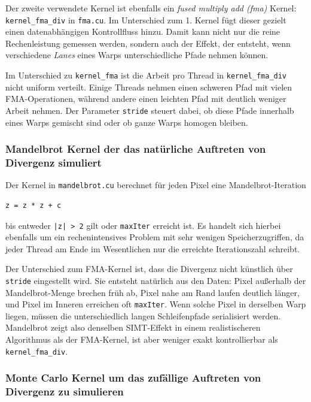 Der zweite verwendete Kernel ist ebenfalls ein \textit{fused multiply add (fma)} Kernel: 
\texttt{kernel\_fma\_div} in \texttt{fma.cu}. 
Im Unterschied zum 1. Kernel fügt dieser gezielt einen datenabhängigen Kontrollfluss hinzu. 
Damit kann nicht nur die reine Rechenleistung gemessen werden, sondern auch der Effekt, der entsteht, 
wenn verschiedene \textit{Lanes} eines Warps unterschiedliche Pfade nehmen können.

Im Unterschied zu \texttt{kernel\_fma} ist die Arbeit pro Thread in \texttt{kernel\_fma\_div} 
nicht uniform verteilt. Einige Threads nehmen einen schweren Pfad mit vielen FMA-Operationen,
während andere einen leichten Pfad mit deutlich weniger Arbeit nehmen. Der Parameter
\texttt{stride} steuert dabei, ob diese Pfade innerhalb eines Warps gemischt sind
oder ob ganze Warps homogen bleiben.

\subsubsection{Mandelbrot Kernel der das natürliche Auftreten von Divergenz simuliert}

Der Kernel in \texttt{mandelbrot.cu} berechnet für jeden Pixel eine
Mandelbrot-Iteration

\begin{verbatim}
z = z * z + c
\end{verbatim}

bis entweder \texttt{|z| > 2} gilt oder \texttt{maxIter} erreicht ist. Es handelt sich 
hierbei ebenfalls um ein rechenintensives Problem mit sehr wenigen Speicherzugriffen, da
jeder Thread am Ende im Wesentlichen nur die erreichte Iterationszahl schreibt.

Der Unterschied zum FMA-Kernel ist, dass die Divergenz
nicht künstlich über \texttt{stride} eingestellt wird. Sie entsteht
natürlich aus den Daten: Pixel außerhalb der Mandelbrot-Menge brechen früh
ab, Pixel nahe am Rand laufen deutlich länger, und Pixel im Inneren erreichen
oft \texttt{maxIter}. Wenn solche Pixel in derselben Warp liegen, müssen die
unterschiedlich langen Schleifenpfade serialisiert werden. Mandelbrot zeigt
also denselben SIMT-Effekt in einem realistischeren Algorithmus als der FMA-Kernel, ist aber
weniger exakt kontrollierbar als \texttt{kernel\_fma\_div}.

\subsubsection{Monte Carlo Kernel um das zufällige Auftreten von Divergenz zu simulieren}

